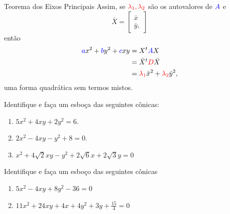 \begin{frame}[label=conicas]{Teorema dos Eixos Principais}
Assim, se ${\color{red}\lambda_1,\lambda_2}$ são os autovalores de ${\color{blue}A}$ e 
\[\bar{X}=
\begin{bmatrix}
\bar{x} \\ \bar{y},
\end{bmatrix}\]
então
\begin{align*}
{\color{blue}a}x^2+{\color{blue}b}y^2+{\color{blue}c}xy& =X^t {\color{blue}A} X\\
& =\bar{X}^t{\color{red}D}\bar{X}\\
& = {\color{red}\lambda_1}\bar{x}^2+{\color{red}\lambda_2}\bar{y}^2,
\end{align*}
uma forma quadrática sem termos mistos.

\end{frame}


\begin{frame}[label=conicas]
\begin{exe}
Identifique e faça um esboça das seguintes cônicas:
\begin{enumerate}
\item $5x^2+4xy+2y^2=6$.
\item $2x^2-4xy-y^2+8=0.$
\item $x^2+4\sqrt{2}xy-y^2+2\sqrt{6}x+2\sqrt{3}y=0$
\end{enumerate}
\end{exe}
\end{frame}


\begin{frame}[label=conicas]
\begin{casa}
Identifique e faça um esboço das seguintes cônicas

\begin{enumerate}
\item  $5x^2-4xy+8y^2-36=0$
\item $11 x^{2} + 24 x y + 4 x + 4 y^{2} + 3 y + \frac{15}{4} = 0$
\end{enumerate}
\end{casa}
\end{frame}

\begin{frame}[label=conicas]



\end{frame}





